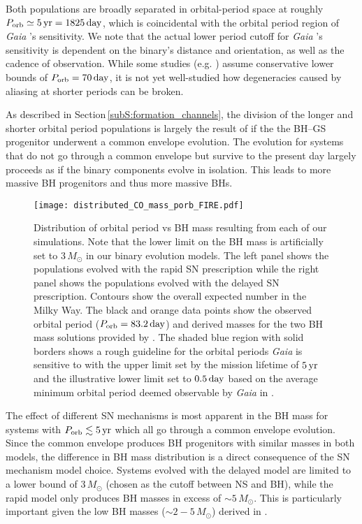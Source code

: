 \documentclass[twocolumn,tighten]{aastex61}
\newcommand{\msun}{{M_\odot}}
\newcommand{\gaia}{{\it Gaia} }
\newcommand{\days}{\rm{day}}
\newcommand{\yr}{\rm{yr}}
\begin{document}
Both populations are broadly separated in orbital-period space at roughly $P_{\rm{orb}}\simeq5\,\yr=1825\,\days$, which is coincidental with the orbital period region of \gaia's sensitivity. We note that the actual lower period cutoff for \gaia's sensitivity is dependent on the binary's distance and orientation, as well as the cadence of observation. While some studies (e.g. \cite{Yamaguchi2018_gaia, Yalinewich2018_gaia}) assume conservative lower bounds of $P_{\rm{orb}}=70\,\days$, it is not yet well-studied how degeneracies caused by aliasing at shorter periods can be broken.

As described in Section\,\ref{subS:formation_channels}, the division of the longer and shorter orbital period populations is largely the result of if the the BH--GS progenitor underwent a common envelope evolution. The evolution for systems that do not go through a common envelope but survive to the present day largely proceeds as if the binary components evolve in isolation. This leads to more massive BH progenitors and thus more massive BHs.


\begin{figure*}
    \centering
    \texttt{[image: distributed\_CO\_mass\_porb\_FIRE.pdf]}
    \caption{Distribution of orbital period vs BH mass resulting from each of our simulations. Note that the lower limit on the BH mass is artificially set to $3\,\msun$ in our binary evolution models. The left panel shows the populations evolved with the rapid SN prescription while the right panel shows the populations evolved with the delayed SN prescription. Contours show the overall expected number in the Milky Way. The black and orange data points show the observed orbital period ($P_{\rm{orb}}=83.2\,\days$) and derived masses for the two BH mass solutions provided by \cite{Thompson2018}. The shaded blue region with solid borders shows a rough guideline for the orbital periods \gaia is sensitive to with the upper limit set by the mission lifetime of $5\,\yr$ and the illustrative lower limit set to $0.5\,\days$ based on the average minimum orbital period deemed observable by \gaia in \citet{Breivik2017_gaia}.}
    \label{fig:porb_mass}
\end{figure*}

The effect of different SN mechanisms is most apparent in the BH mass for systems with $P_{\rm{orb}}\lesssim5\,\yr$ which all go through a common envelope evolution. Since the common envelope produces BH progenitors with similar masses in both models, the difference in BH mass distribution is a direct consequence of the SN mechanism model choice. Systems evolved with the delayed model are limited to a lower bound of $3\,\msun$ (chosen as the cutoff between NS and BH), while the rapid model only produces BH masses in excess of $\sim5\,\msun$. This is particularly important given the low BH masses ($\sim2-5\,\msun$) derived in \cite{Thompson2018}.
\end{document}
